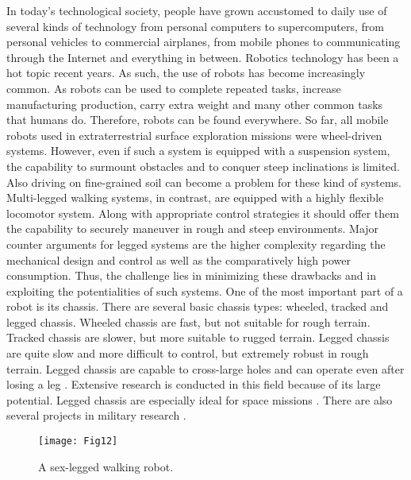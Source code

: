 %
%
%
In today’s technological society, people have grown accustomed to daily use of several kinds of technology from personal computers to supercomputers, from personal vehicles to commercial airplanes, from mobile phones to communicating through the Internet and everything in between. Robotics technology has been a hot topic recent years.  As such, the use of robots has become increasingly common. As robots can be used to complete repeated tasks, increase manufacturing production, carry extra weight and many other common tasks that humans do. Therefore, robots can be found everywhere. 
So far, all mobile robots used in extraterrestrial surface exploration missions were wheel-driven systems. However, even if such a system is equipped with a suspension system, the capability to surmount obstacles and to conquer steep inclinations is limited. Also driving on fine-grained soil can become a problem for these kind of systems. Multi-legged walking systems, in contrast, are equipped with a highly flexible locomotor system. Along with appropriate control strategies it should offer them the capability to securely maneuver in rough and steep environments. Major counter arguments for legged systems are the higher complexity regarding the mechanical design and control as well as the comparatively high power consumption. Thus, the challenge lies in minimizing these drawbacks and in exploiting the potentialities of such systems. 
One of the most important part of a robot is its chassis. There are several basic chassis types: wheeled, tracked and legged chassis. Wheeled chassis are fast, but not suitable for rough terrain. Tracked chassis are slower, but more suitable to rugged terrain. Legged chassis are quite slow and more difficult to control, but extremely robust in rough terrain. Legged chassis are capable to cross-large holes and can operate even after losing a leg \cite{1}. Extensive research is conducted in this field because of its large potential. Legged chassis are especially ideal for space missions \cite{2,3} . There are also several projects in military research \cite{4,5}.
\begin{figure}[h]
    \centering
    \texttt{[image: Fig12]}
    \caption{ A sex-legged walking robot.}
    \label{fig1}
\end{figure}

